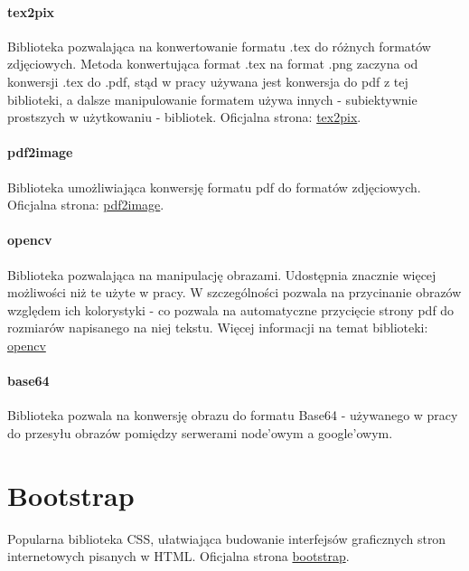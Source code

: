 \paragraph{tex2pix} Biblioteka pozwalająca na konwertowanie formatu .tex do różnych formatów zdjęciowych. Metoda konwertująca format .tex na format .png zaczyna od konwersji .tex do .pdf, stąd w pracy używana jest konwersja do pdf z tej biblioteki, a dalsze manipulowanie formatem używa innych - subiektywnie prostszych w użytkowaniu - bibliotek. 
\ind Oficjalna strona: \href{https://pypi.org/project/tex2pix/}{tex2pix}.

\paragraph{pdf2image} Biblioteka  umożliwiająca konwersję formatu pdf do formatów zdjęciowych.
\ind Oficjalna strona: \href{https://pypi.org/project/pdf2image/}{pdf2image}.
\paragraph{opencv} Biblioteka pozwalająca na manipulację obrazami. Udostępnia znacznie więcej możliwości niż te użyte w pracy. W szczególności pozwala na przycinanie obrazów względem ich kolorystyki - co pozwala na automatyczne przycięcie strony pdf do rozmiarów napisanego na niej tekstu. Więcej informacji na temat biblioteki: \href{https://pypi.org/project/opencv-python/}{opencv}
\paragraph{base64} Biblioteka pozwala na konwersję obrazu do formatu Base64 - używanego w pracy do przesyłu obrazów pomiędzy serwerami node'owym a google'owym. 

\section{Bootstrap}  
Popularna biblioteka CSS, ułatwiająca budowanie interfejsów graficznych stron internetowych pisanych w HTML. Oficjalna strona \href{https://getbootstrap.com/}{bootstrap}.




